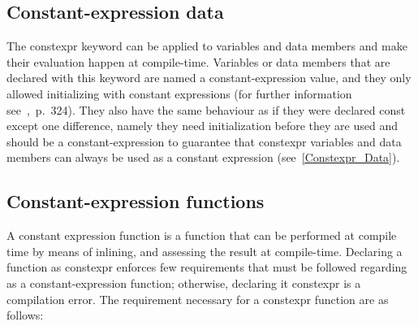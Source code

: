 \documentclass[11pt]{report}
\begin{document}
\subsection{Constant-expression data}
\label{subsection: constant-expression data}
The constexpr keyword can be applied to variables and data members and make their evaluation happen at compile-time. Variables or data members that are declared with this keyword are named a constant-expression value, and they only allowed initializing with constant expressions (for further information see~\cite{Williams:2012:CCA},~p.~324). They also have the same behaviour as if they were declared const except one difference, namely they need initialization before they are used and should be a constant-expression to guarantee that constexpr variables and data members can always be used as a constant expression (see~\ref{Constexpr_Data}). 

\subsection{Constant-expression functions}
\label{Constant Expression Functions}
A constant expression function is a function that can be performed at compile time by means of inlining, and assessing the result at compile-time. Declaring a function as constexpr enforces few requirements that must be followed regarding as a constant-expression function; otherwise, declaring it constexpr is a compilation error. The requirement necessary for a constexpr function are as follows:
\end{document}
